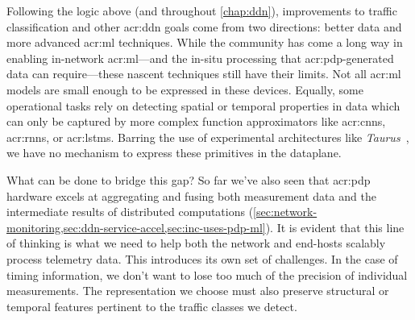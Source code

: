 Following the logic above (and throughout \cref{chap:ddn}), improvements to traffic classification and other \gls{acr:ddn} goals come from two directions: better data and more advanced \gls{acr:ml} techniques.
While the community has come a long way in enabling in-network \gls{acr:ml}---and the in-situ processing that \gls{acr:pdp}-generated data can require---these nascent techniques still have their limits.
Not all \gls{acr:ml} models are small enough to be expressed in these devices.
Equally, some operational tasks rely on detecting spatial or temporal properties in data which can only be captured by more complex function approximators like \glspl{acr:cnn}, \glspl{acr:rnn}, or \glspl{acr:lstm}.
Barring the use of experimental architectures like \emph{Taurus}~\parencite{DBLP:conf/asplos/SwamyR0GO22}, we have no mechanism to express these primitives in the dataplane.

What can be done to bridge this gap?
So far we've also seen that \gls{acr:pdp} hardware excels at aggregating and fusing both measurement data and the intermediate results of distributed computations (\cref{sec:network-monitoring,sec:ddn-service-accel,sec:inc-uses-pdp-ml}).
It is evident that this line of thinking is what we need to help both the network and end-hosts scalably process telemetry data.
This introduces its own set of challenges.
In the case of timing information, we don't want to lose too much of the precision of individual measurements.
The representation we choose must also preserve structural or temporal features pertinent to the traffic classes we detect.

%
%


